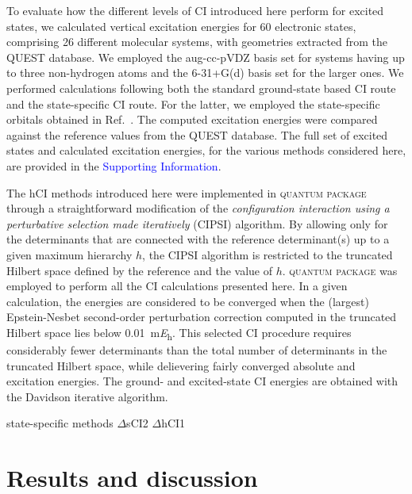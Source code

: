 \documentclass[aip,jcp,reprint,noshowkeys,superscriptaddress]{revtex4-1}
\newcommand{\SupInf}{\textcolor{blue}{Supporting Information}}
\newcommand{\QP}{\textsc{quantum package}}
\begin{document}
To evaluate how the different levels of CI introduced here perform for excited states,
we calculated vertical excitation energies for 60 electronic states, comprising 26 different molecular systems, with geometries extracted from the QUEST database. \cite{Veril_2021}
We employed the aug-cc-pVDZ basis set for systems having up to three non-hydrogen atoms and the 6-31+G(d) basis set for the larger ones.
We performed calculations following both the standard ground-state based CI route and the state-specific CI route. \cite{Kossoski_2023}
For the latter, we employed the state-specific orbitals obtained in Ref.~.
The computed excitation energies were compared against the reference values from the QUEST database. \cite{Veril_2021}
The full set of excited states and calculated excitation energies, for the various methods considered here, are provided in the {\SupInf}.

The hCI methods introduced here were implemented in {\QP} \cite{Garniron_2019} through a straightforward modification of the
\textit{configuration interaction using a perturbative selection made iteratively} (CIPSI) algorithm. \cite{Huron_1973,Giner_2013,Giner_2015,Garniron_2018}
By allowing only for the determinants that are connected with the reference determinant(s) up to a given maximum hierarchy $h$,
the CIPSI algorithm is restricted to the truncated Hilbert space defined by the reference and the value of $h$.
{\QP} \cite{Garniron_2019} was employed to perform all the CI calculations presented here.
In a given calculation, the energies are considered to be converged when the (largest) Epstein-Nesbet second-order perturbation correction computed in the truncated Hilbert space 
lies below \SI{0.01}{\milli\hartree}. \cite{Garniron_2018}
This selected CI procedure requires considerably fewer determinants than the total number of determinants in the truncated Hilbert space,
while delievering fairly converged absolute and excitation energies.
The ground- and excited-state CI energies are obtained with the Davidson iterative algorithm. \cite{Davidson_1975}

state-specific methods
$\Delta$sCI2 
$\Delta$hCI1


\section{Results and discussion}
\label{sec:res}
\end{document}
